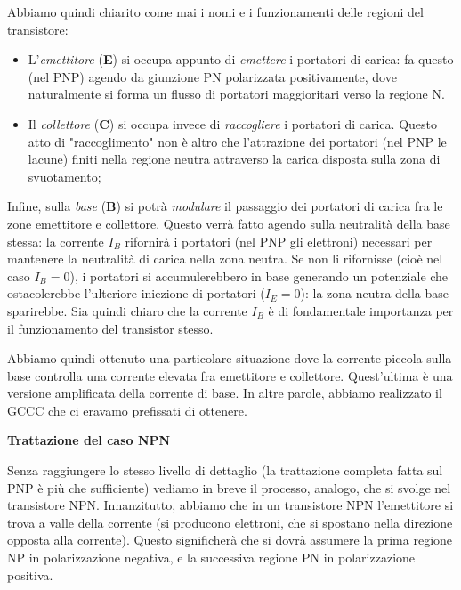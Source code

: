 \documentclass[a4paper,11pt]{article}
\begin{document}
Abbiamo quindi chiarito come mai i nomi e i funzionamenti delle regioni del transistore:
\begin{itemize}
	\item L'\textit{emettitore} (\textbf{E}) si occupa appunto di \textit{emettere} i portatori di carica: fa questo (nel PNP) agendo da giunzione PN polarizzata positivamente, dove naturalmente si forma un flusso di portatori maggioritari verso la regione N.
	\item Il \textit{collettore} (\textbf{C}) si occupa invece di \textit{raccogliere} i portatori di carica. Questo atto di "raccoglimento" non è altro che l'attrazione dei portatori (nel PNP le lacune) finiti nella regione neutra attraverso la carica disposta sulla zona di svuotamento;
\end{itemize}

Infine, sulla \textit{base} (\textbf{B}) si potrà \textit{modulare} il passaggio dei portatori di carica fra le zone emettitore e collettore. 
Questo verrà fatto agendo sulla neutralità della base stessa: la corrente $I_B$ rifornirà i portatori (nel PNP gli elettroni) necessari per mantenere la neutralità di carica nella zona neutra. Se non li rifornisse (cioè nel caso $I_B = 0$), i portatori si accumulerebbero in base generando un potenziale che ostacolerebbe l’ulteriore iniezione di portatori ($I_E = 0$): la zona neutra della base sparirebbe. Sia quindi chiaro che la corrente $I_B$ è di fondamentale importanza per il funzionamento del transistor stesso.

Abbiamo quindi ottenuto una particolare situazione dove la corrente piccola sulla base controlla una corrente elevata fra emettitore e collettore. Quest’ultima è una versione amplificata della corrente di base. In altre parole, abbiamo realizzato il GCCC che ci eravamo prefissati di ottenere.

\par\smallskip

\noindent
\textbf{\textsf{Trattazione del caso NPN}}

\noindent
Senza raggiungere lo stesso livello di dettaglio (la trattazione completa fatta sul PNP è più che sufficiente) vediamo in breve il processo, analogo, che si svolge nel transistore NPN. Innanzitutto, abbiamo che in un transistore NPN l'emettitore si trova a valle della corrente (si producono elettroni, che si spostano nella direzione opposta alla corrente). Questo significherà che si dovrà assumere la prima regione NP in polarizzazione negativa, e la successiva regione PN in polarizzazione positiva.
\end{document}

